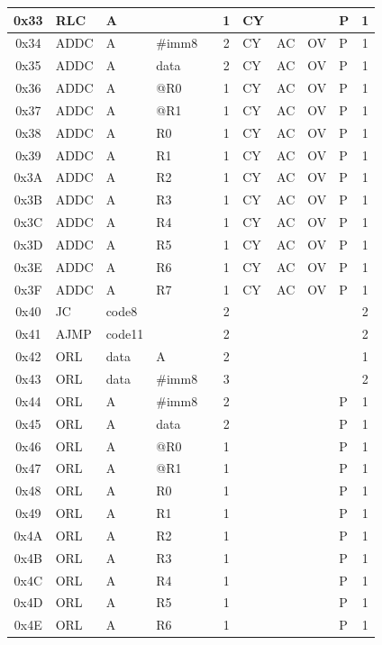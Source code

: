\documentclass[a4paper,twoside,12pt]{book}
\begin{document}
{\begin{longtable}{|c|l|lll|c|llll|c|}
		0x33	& RLC	& A	&	&	& 1	& CY	&	&	& P	& 1	\\\hline
		0x34	& ADDC	& A	& \#imm8&	& 2	& CY	& AC	& OV	& P	& 1	\\\hline
		0x35	& ADDC	& A	& data	&	& 2	& CY	& AC	& OV	& P	& 1	\\\hline
		0x36	& ADDC	& A	& @R0	&	& 1	& CY	& AC	& OV	& P	& 1	\\\hline
		0x37	& ADDC	& A	& @R1	&	& 1	& CY	& AC	& OV	& P	& 1	\\\hline
		0x38	& ADDC	& A	& R0	&	& 1	& CY	& AC	& OV	& P	& 1	\\\hline
		0x39	& ADDC	& A	& R1	&	& 1	& CY	& AC	& OV	& P	& 1	\\\hline
		0x3A	& ADDC	& A	& R2	&	& 1	& CY	& AC	& OV	& P	& 1	\\\hline
		0x3B	& ADDC	& A	& R3	&	& 1	& CY	& AC	& OV	& P	& 1	\\\hline
		0x3C	& ADDC	& A	& R4	&	& 1	& CY	& AC	& OV	& P	& 1	\\\hline
		0x3D	& ADDC	& A	& R5	&	& 1	& CY	& AC	& OV	& P	& 1	\\\hline
		0x3E	& ADDC	& A	& R6	&	& 1	& CY	& AC	& OV	& P	& 1	\\\hline
		0x3F	& ADDC	& A	& R7	&	& 1	& CY	& AC	& OV	& P	& 1	\\\hline
		0x40	& JC	& code8	&	&	& 2	&	&	&	&	& 2	\\\hline
		0x41	& AJMP	& code11&	&	& 2	&	&	&	&	& 2	\\\hline
		0x42	& ORL	& data	& A	&	& 2	&	&	&	&	& 1	\\\hline
		0x43	& ORL	& data	& \#imm8&	& 3	&	&	&	&	& 2	\\\hline
		0x44	& ORL	& A	& \#imm8&	& 2	&	&	&	& P	& 1	\\\hline
		0x45	& ORL	& A	& data	&	& 2	&	&	&	& P	& 1	\\\hline
		0x46	& ORL	& A	& @R0	&	& 1	&	&	&	& P	& 1	\\\hline
		0x47	& ORL	& A	& @R1	&	& 1	&	&	&	& P	& 1	\\\hline
		0x48	& ORL	& A	& R0	&	& 1	&	&	&	& P	& 1	\\\hline
		0x49	& ORL	& A	& R1	&	& 1	&	&	&	& P	& 1	\\\hline
		0x4A	& ORL	& A	& R2	&	& 1	&	&	&	& P	& 1	\\\hline
		0x4B	& ORL	& A	& R3	&	& 1	&	&	&	& P	& 1	\\\hline
		0x4C	& ORL	& A	& R4	&	& 1	&	&	&	& P	& 1	\\\hline
		0x4D	& ORL	& A	& R5	&	& 1	&	&	&	& P	& 1	\\\hline
		0x4E	& ORL	& A	& R6	&	& 1	&	&	&	& P	& 1	\\\hline

\end{longtable}}
\end{document}
